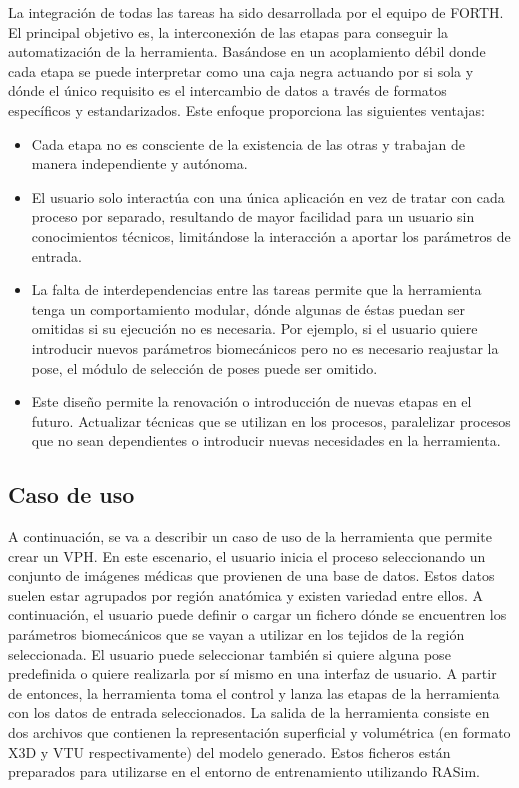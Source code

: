 La integración de todas las tareas ha sido desarrollada por el equipo de \ac{FORTH}. El principal objetivo es, la interconexión de las etapas para conseguir la automatización de la herramienta. Basándose en un acoplamiento débil donde cada etapa se puede interpretar como una caja negra actuando por si sola y dónde el único requisito es el intercambio de datos a través de formatos específicos y estandarizados. Este enfoque proporciona las siguientes ventajas:
\begin{itemize}
    \item Cada etapa no es consciente de la existencia de las otras y trabajan de manera independiente y autónoma.
    \item El usuario solo interactúa con una única aplicación en vez de tratar con cada proceso por separado, resultando de mayor facilidad para un usuario sin conocimientos técnicos, limitándose la interacción a aportar los parámetros de entrada.  
    \item La falta de interdependencias entre las tareas permite que la herramienta tenga un comportamiento modular, dónde algunas de éstas puedan ser omitidas si su ejecución no es necesaria. Por ejemplo, si el usuario quiere introducir nuevos parámetros biomecánicos pero no es necesario reajustar la pose, el módulo de selección de poses puede ser omitido.
    \item Este diseño permite la renovación o introducción de nuevas etapas en el futuro. Actualizar técnicas que se utilizan en los procesos, paralelizar procesos que no sean dependientes o introducir nuevas necesidades en la herramienta.
    
\end{itemize}

\subsection{Caso de uso}
\label{rasim:casodeuso}
A continuación, se va a describir un caso de uso de la herramienta que permite crear un \ac{VPH}. 
En este escenario, el usuario inicia el proceso seleccionando un conjunto de imágenes médicas que provienen de una base de datos. Estos datos suelen estar agrupados por región anatómica y existen variedad entre ellos. A continuación, el usuario puede definir o cargar un fichero dónde se encuentren los parámetros biomecánicos que se vayan a utilizar en los tejidos de la región seleccionada. El usuario puede seleccionar también si quiere alguna pose predefinida o quiere realizarla por sí mismo en una interfaz de usuario. A partir de entonces, la herramienta toma el control y lanza las etapas de la herramienta con los datos de entrada seleccionados. La salida de la herramienta consiste en dos archivos que contienen la representación superficial y volumétrica (en formato \ac{X3D} y \ac{VTU} respectivamente) del modelo generado. Estos ficheros están preparados para utilizarse en el entorno de entrenamiento utilizando \ac{RASim}.

